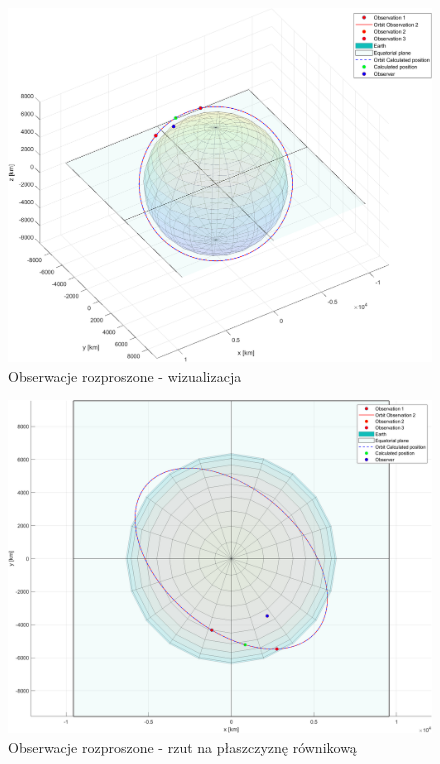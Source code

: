     \begin{figure}[h]
    \centering
    \includegraphics[width=\textwidth]{tex/img/anomaly15.png}
    \caption{Obserwacje rozproszone - wizualizacja}
    \label{fig:Dlugi-1}
    \end{figure}
    
    \begin{figure}[h]
    \centering
    \includegraphics[width=\textwidth]{tex/img/anomaly15_rownikowa.png}
    \caption{Obserwacje rozproszone - rzut na płaszczyznę równikową}
    \label{fig:Dlugi-2}
    \end{figure}



